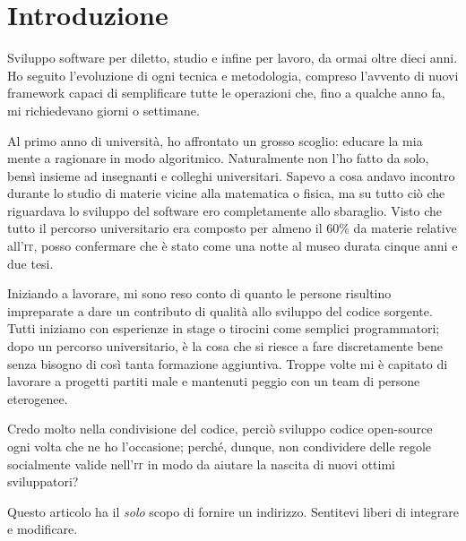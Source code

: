 \section{Introduzione}

Sviluppo software per diletto, studio e infine per lavoro, da ormai oltre dieci anni. Ho seguito l’evoluzione di ogni tecnica e metodologia, compreso l’avvento di nuovi framework capaci di semplificare tutte le operazioni che, fino a qualche anno fa, mi richiedevano giorni o settimane.

Al primo anno di università, ho affrontato un grosso scoglio: educare la mia mente a ragionare in modo algoritmico. Naturalmente non l’ho fatto da solo, bensì insieme ad insegnanti e colleghi universitari. Sapevo a cosa andavo incontro durante lo studio di materie vicine alla matematica o fisica, ma su tutto ciò che riguardava lo sviluppo del software ero completamente allo sbaraglio. Visto che tutto il percorso universitario era composto per almeno il 60\% da materie relative all’\textsc{it}, posso confermare che è stato come una notte al museo durata cinque anni e due tesi.

Iniziando a lavorare, mi sono reso conto di quanto le persone risultino impreparate a dare un contributo di qualità allo sviluppo del codice sorgente. Tutti iniziamo con esperienze in stage o tirocini come semplici programmatori; dopo un percorso universitario, è la cosa che si riesce a fare discretamente bene senza bisogno di così tanta formazione aggiuntiva. Troppe volte mi è capitato di lavorare a progetti partiti male e mantenuti peggio con un team di persone eterogenee.

Credo molto nella condivisione del codice, perciò sviluppo codice open-source ogni volta che ne ho l’occasione; perché, dunque, non condividere delle regole socialmente valide nell’\textsc{it} in modo da aiutare la nascita di nuovi ottimi sviluppatori?

Questo articolo ha il \emph{solo} scopo di fornire un indirizzo. Sentitevi liberi di integrare e modificare.